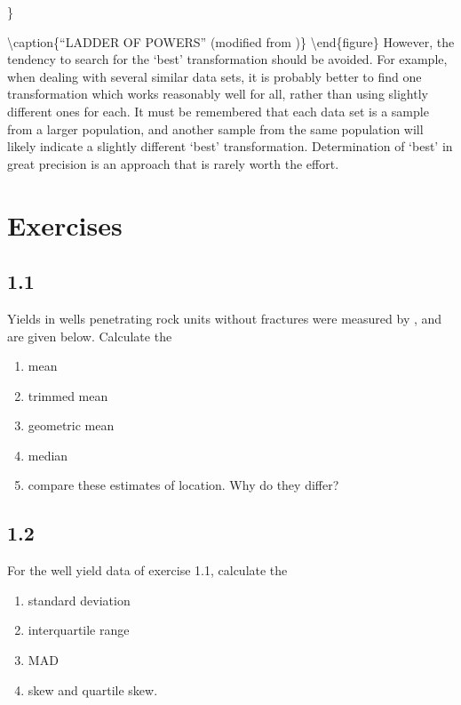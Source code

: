 \documentclass[]{book}
\providecommand{\tightlist}{%
  \setlength{\itemsep}{0pt}\setlength{\parskip}{0pt}}
\begin{document}
\}

\textbackslash{}caption\{``LADDER OF POWERS'' (modified from \citet{velleman_applications_1981})\}\label{fig:fig-1-5}
\textbackslash{}end\{figure\}
However, the tendency to search for the `best' transformation should be avoided. For example, when dealing with several similar data sets, it is probably better to find one transformation which works reasonably well for all, rather than using slightly different ones for each. It must be remembered that each data set is a sample from a larger population, and another sample from the same population will likely indicate a slightly different `best' transformation. Determination of `best' in great precision is an approach that is rarely worth the effort.

\hypertarget{exercises}{%
\section*{Exercises}\label{exercises}}

\hypertarget{section}{%
\subsection*{1.1}\label{section}}

Yields in wells penetrating rock units without fractures were measured by \citet{wright_effects_1985}, and are given below. Calculate the

\begin{enumerate}
\def\labelenumi{\alph{enumi}.}
\tightlist
\item
  mean
\item
  trimmed mean
\item
  geometric mean
\item
  median
\item
  compare these estimates of location. Why do they differ?
\end{enumerate}

\hypertarget{section-1}{%
\subsection*{1.2}\label{section-1}}

For the well yield data of exercise 1.1, calculate the

\begin{enumerate}
\def\labelenumi{\alph{enumi}.}
\tightlist
\item
  standard deviation
\item
  interquartile range
\item
  MAD
\item
  skew and quartile skew.
\end{enumerate}
\end{document}
